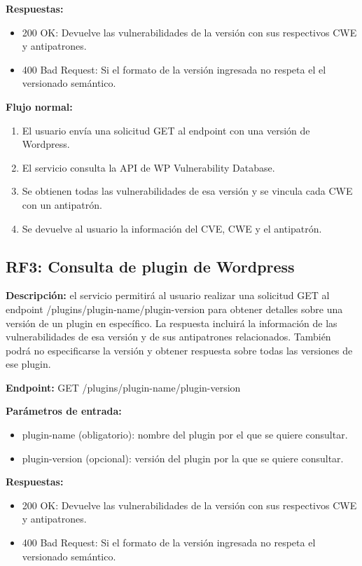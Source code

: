 \textbf{Respuestas:}

\begin{itemize}
    \item 200 OK: Devuelve las vulnerabilidades de la versión con sus respectivos CWE y antipatrones.
    \item 400 Bad Request: Si el formato de la versión ingresada no respeta el el versionado semántico.
\end{itemize}

\textbf{Flujo normal:}

\begin{enumerate}
    \item El usuario envía una solicitud GET al endpoint con una versión de Wordpress.
    \item El servicio consulta la API de WP Vulnerability Database.
    \item Se obtienen todas las vulnerabilidades de esa versión y se vincula cada CWE con un antipatrón.
    \item Se devuelve al usuario la información del CVE, CWE y el antipatrón.
\end{enumerate}

\subsection{RF3: Consulta de plugin de Wordpress}

\textbf{Descripción:} el servicio permitirá al usuario realizar una solicitud GET al endpoint /plugins/{plugin-name}/{plugin-version} para obtener detalles sobre una versión de un plugin en específico. La respuesta incluirá la información de las vulnerabilidades de esa versión y de sus antipatrones relacionados. También podrá no especificarse la versión y obtener respuesta sobre todas las versiones de ese plugin.

\textbf{Endpoint:} GET /plugins/{plugin-name}/{plugin-version}

\textbf{Parámetros de entrada: }

\begin{itemize}
    \item plugin-name (obligatorio): nombre del plugin por el que se quiere consultar.
    \item plugin-version (opcional): versión del plugin por la que se quiere consultar.
\end{itemize}

\textbf{Respuestas:}

\begin{itemize}
    \item 200 OK: Devuelve las vulnerabilidades de la versión con sus respectivos CWE y antipatrones.
    \item 400 Bad Request: Si el formato de la versión ingresada no respeta el versionado semántico.
\end{itemize}

